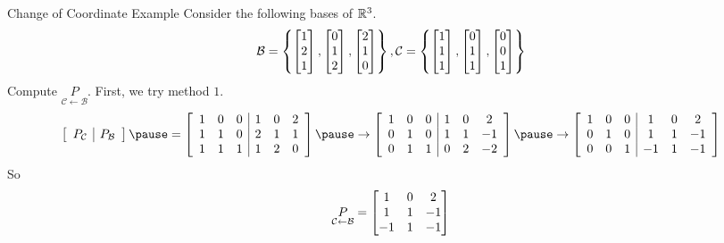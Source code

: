 \documentclass[xcoler=dvipsnames, aspectratio=169]{beamer}
\newcommand{\B}{\mathcal{B}}
\newcommand{\C}{\mathcal{C}}
\begin{document}
    \begin{frame}{Change of Coordinate Example}
        \footnotesize
        Consider the following bases of $\mathbb{R}^3$.
        \[
            \B = \setBasic{\bMat{1\\2\\1}, \bMat{0\\1\\2}, \bMat{2\\1\\0}}, \C = \setBasic{
                \bMat{1\\1\\1}, \bMat{0\\1\\1}, \bMat{0\\0\\1}}
        \]
        Compute $\underset{\C\leftarrow\B}{P}$.\pause
        First, we try method $1$.\pause
        \[
            \aMat{c|c}{
                P_\C & P_\B
            }\pause = \aMat{ccc|ccc}{
                1 & 0 & 0 & 1 & 0 & 2\\
                1 & 1 & 0 & 2 & 1 & 1\\
                1 & 1 & 1 & 1 & 2 & 0
            }\pause\rightarrow\aMat{ccc|ccc}{
                1 & 0 & 0 & 1 & 0 & 2\\
                0 & 1 & 0 & 1 & 1 & -1\\
                0 & 1 & 1 & 0 & 2 & -2
            }\pause\rightarrow\aMat{ccc|ccc}{
                1 & 0 & 0 & 1 & 0 & 2  \\
                0 & 1 & 0 & 1 & 1 & -1 \\
                0 & 0 & 1 & -1 & 1 & -1
            }
        \]
        So
        \[
            \underset{\C\leftarrow\B}{P} = \bMat{
                1 & 0 & 2\\
                1 & 1 & -1\\
                -1 & 1 & -1
            }
        \]
    \end{frame}
\end{document}
